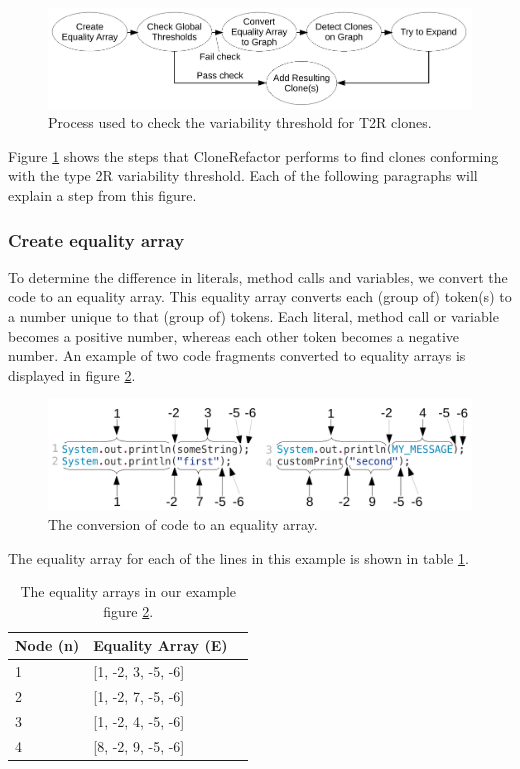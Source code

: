 \begin{figure}[H]
  \centering
  \includegraphics[width=1\columnwidth]{img/CloneRefactorT2RFlow}
  \caption{Process used to check the variability threshold for T2R clones.}
  \label{fig:clonerefactort2rflow}
\end{figure}

Figure \ref{fig:clonerefactort2rflow} shows the steps that CloneRefactor performs to find clones conforming with the type 2R variability threshold. Each of the following paragraphs will explain a step from this figure.

\subsubsection{Create equality array}
To determine the difference in literals, method calls and variables, we convert the code to an equality array. This equality array converts each (group of) token(s) to a number unique to that (group of) tokens. Each literal, method call or variable becomes a positive number, whereas each other token becomes a negative number. An example of two code fragments converted to equality arrays is displayed in figure \ref{fig:equalityarrays}.

\begin{figure}[H]
  \centering
  \includegraphics[width=1\columnwidth]{img/equality}
  \caption{The conversion of code to an equality array.}
  \label{fig:equalityarrays}
\end{figure}

The equality array for each of the lines in this example is shown in table \ref{table:equalityarrays}.

\begin{table}[H]
\begin{center}
 \caption{The equality arrays in our example figure \ref{fig:equalityarrays}.} \label{table:equalityarrays}
 \medskip
\begin{tabular}{|l|l|l|}
\hline
Node (n) & Equality Array (E) \\ \hline
1        & {[}1, -2, 3, -5, -6{]} \\ \hline
2        & {[}1, -2, 7, -5, -6{]} \\ \hline
3        & {[}1, -2, 4, -5, -6{]} \\ \hline
4        & {[}8, -2, 9, -5, -6{]} \\ \hline
\end{tabular}
\end{center}
\end{table}

